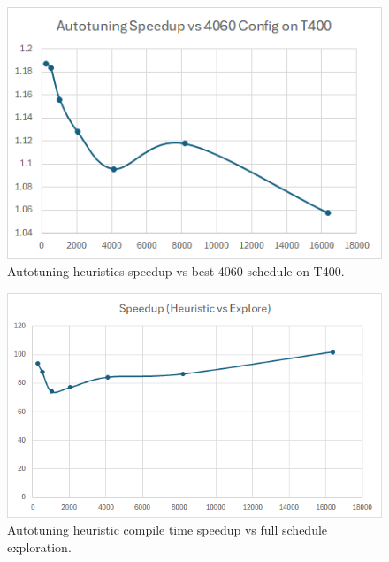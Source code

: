 \begin{figure}[htb]
  \centering
  \includegraphics[width=\linewidth]{figures/AutotuningSpeedupvs4060Sched_T400.png}
  \caption{Autotuning heuristics speedup vs best 4060 schedule on T400.}
  \label{Fig:AutotuningSpeedupvs4060Sched_T400}
\end{figure}

\begin{figure}[htb]
  \centering
  \includegraphics[width=\linewidth]{figures/HeuristicVsFullExplore_Speedup.png}
  \caption{Autotuning heuristic compile time speedup vs full schedule exploration.}
  \label{Fig:HeuristicVsFullExplore_Speedup}
\end{figure}

